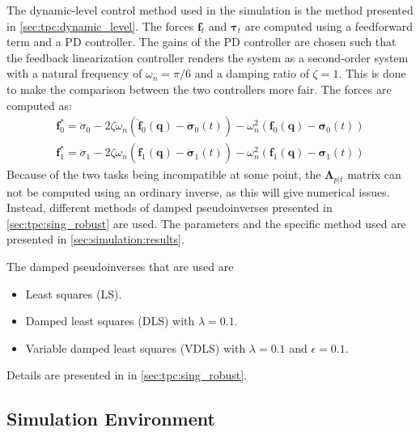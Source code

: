 The dynamic-level control method used in the simulation is the method presented in \autoref{sec:tpc:dynamic_level}. The forces $\bm{f}_t$ and $\bm{\tau}_t$ are computed using
a feedforward term and a PD controller. The gains of the PD controller are chosen
such that the feedback linearization controller renders the system as a second-order
system with a natural frequency of $\omega_n = \pi/6$ and a damping ratio of $\zeta = 1$.
This is done to make the comparison between the two controllers more fair. The forces
are computed as:
\begin{subequations}
\begin{align}
    \bm{f}_0^* = \ddot{\sigma}_0
    - 2 \zeta \omega_n \left(\dot{\bm{f}}_0(\bm{q}) - \dot{\bm{\sigma}}_0(t)\right)
    - \omega_n^2 \left(\bm{f}_0(\bm{q}) - \bm{\sigma}_0(t)\right) \\
    \bm{f}_1^* = \ddot{\sigma}_1
    - 2 \zeta \omega_n \left(\dot{\bm{f}}_1(\bm{q}) - \dot{\bm{\sigma}}_1(t)\right)
    - \omega_n^2 \left(\bm{f}_1(\bm{q}) - \bm{\sigma}_1(t)\right)
\end{align}
\end{subequations}
Because of the two tasks being incompatible at some point, the $\bm{\Lambda}_{p|t}$
matrix can not be computed using an ordinary inverse, as this will give numerical issues.
Instead, different methods of damped pseudoinverses presented in \autoref{sec:tpc:sing_robust}
are used. The parameters and the specific method used are presented in \autoref{sec:simulation:results}.

The damped pseudoinverses that are used are
\begin{itemize}
    \item Least squares (LS).
    \item Damped least squares (DLS) with $\lambda = 0.1$.
    \item Variable damped least squares (VDLS) with $\lambda = 0.1$ and $\epsilon = 0.1$.
\end{itemize}
Details are presented in in \autoref{sec:tpc:sing_robust}.

\subsection{Simulation Environment}

